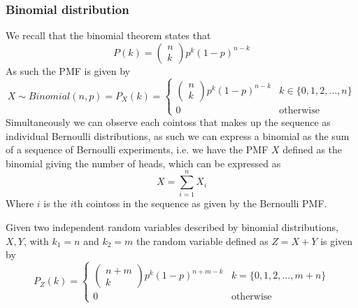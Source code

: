 \subsubsection{Binomial distribution}
We recall that the binomial theorem states that
\[
    P(k)=\begin{pmatrix}n\\k\end{pmatrix}p^{k}(1-p)^{n-k}
\]
As such the PMF is given by
\[
    X\sim Binomial(n,p)=P_{X}(k)=\begin{cases}\begin{pmatrix}n\\k\end{pmatrix}p^{k}(1-p)^{n-k} & k\in\{0,1,2,\ldots,n\} \\ 0 & \text{otherwise}\end{cases}
\]
Simultaneously we can observe each cointoss that makes up the sequence as individual Bernoulli distributions, as such we can express a binomial as the sum of a sequence of Bernoulli experiments, i.e. we have the PMF $X$ defined as the binomial giving the number of heads, which can be expressed as
\[
    X=\sum_{i=1}^{n}X_{i}
\]
Where $i$ is the $i$th cointoss in the sequence as given by the Bernoulli PMF.
\begin{theorem}
    Given two independent random variables described by binomial distributions, $X,Y$, with $k_{1}=n$ and $k_{2}=m$ the random variable defined as $Z=X+Y$ is given by
    \[
        P_{Z}(k)=\begin{cases}\begin{pmatrix}n+m\\k\end{pmatrix}p^{k}(1-p)^{n+m-k} & k=\{0,1,2,\ldots,m+n\} \\ 0 & \text{otherwise}\end{cases}
    \]
\end{theorem}

